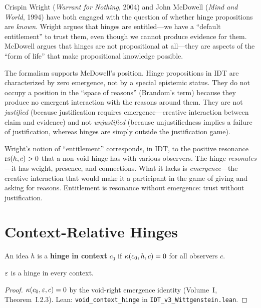 \begin{interpretation}
Crispin Wright (\textit{Warrant for Nothing}, 2004) and John McDowell
(\textit{Mind and World}, 1994) have both engaged with the question of
whether hinge propositions are \emph{known}. Wright argues that hinges are
entitled---we have a ``default entitlement'' to trust them, even though we
cannot produce evidence for them. McDowell argues that hinges are not
propositional at all---they are aspects of the ``form of life'' that make
propositional knowledge possible.

The formalism supports McDowell's position. Hinge propositions in IDT are
characterized by zero emergence, not by a special epistemic status. They do
not occupy a position in the ``space of reasons'' (Brandom's term) because
they produce no emergent interaction with the reasons around them. They are
not \emph{justified} (because justification requires emergence---creative
interaction between claim and evidence) and not \emph{unjustified} (because
unjustifiedness implies a failure of justification, whereas hinges are
simply outside the justification game).

Wright's notion of ``entitlement'' corresponds, in IDT, to the positive
resonance $\mathrm{rs}(h, c) > 0$ that a non-void hinge has with various observers.
The hinge \emph{resonates}---it has weight, presence, and connections. What
it lacks is \emph{emergence}---the creative interaction that would make it a
participant in the game of giving and asking for reasons. Entitlement is
resonance without emergence: trust without justification.
\end{interpretation}

\section{Context-Relative Hinges}

\begin{definition}
\label{def:context-hinge}
An idea $h$ is a \textbf{hinge in context} $c_0$ if $\kappa(c_0, h, c) = 0$
for all observers $c$.
\end{definition}

\begin{theorem}
\label{thm:void-context-hinge}
$\varepsilon$ is a hinge in every context.
\end{theorem}

\begin{proof}
$\kappa(c_0, \varepsilon, c) = 0$ by the void-right emergence identity
(Volume~I, Theorem~I.2.3).
Lean: \texttt{void\_context\_hinge} in \texttt{IDT\_v3\_Wittgenstein.lean}.
\end{proof}

